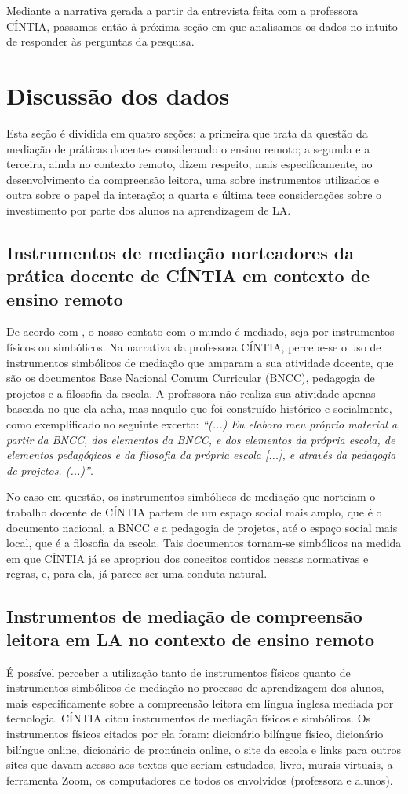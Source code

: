 \documentclass{textolivre}
\begin{document}
Mediante a narrativa gerada a partir da entrevista feita com a professora CÍNTIA, passamos então à próxima seção em que analisamos os dados no intuito de responder às perguntas da pesquisa.

\section{Discussão dos dados}
Esta seção é dividida em quatro seções: a primeira que trata da questão da mediação de práticas docentes considerando o ensino remoto; a segunda e a terceira, ainda no contexto remoto, dizem respeito, mais especificamente, ao desenvolvimento da compreensão leitora, uma sobre instrumentos utilizados e outra sobre o papel da interação; a quarta e última tece considerações sobre o investimento por parte dos alunos na aprendizagem de LA.

\subsection{Instrumentos de mediação norteadores da prática docente de CÍNTIA em contexto de ensino remoto}
De acordo com \textcite{vygotsky1978}, o nosso contato com o mundo é mediado, seja por instrumentos físicos ou simbólicos. Na narrativa da professora CÍNTIA, percebe-se o uso de instrumentos simbólicos de mediação que amparam a sua atividade docente, que são os documentos Base Nacional Comum Curricular (BNCC), pedagogia de projetos e a filosofia da escola. A professora não realiza sua atividade apenas baseada no que ela acha, mas naquilo que foi construído histórico e socialmente, como exemplificado no seguinte excerto: \emph{“(...) Eu elaboro meu próprio material a partir da BNCC, dos elementos da BNCC, e dos elementos da própria escola, de elementos pedagógicos e da filosofia da própria escola [...], e através da pedagogia de projetos. (...)”}.

No caso em questão, os instrumentos simbólicos de mediação que norteiam o trabalho docente de CÍNTIA partem de um espaço social mais amplo, que é o documento nacional, a BNCC e a pedagogia de projetos, até o espaço social mais local, que é a filosofia da escola. Tais documentos tornam-se simbólicos na medida em que CÍNTIA já se apropriou dos conceitos contidos nessas normativas e regras, e, para ela, já parece ser uma conduta natural.

\subsection{Instrumentos de mediação de compreensão leitora em LA no contexto de ensino remoto}
É possível perceber a utilização tanto de instrumentos físicos quanto de instrumentos simbólicos de mediação no processo de aprendizagem dos alunos, mais especificamente sobre a compreensão leitora em língua inglesa mediada por tecnologia. CÍNTIA citou instrumentos de mediação físicos e simbólicos. Os instrumentos físicos citados por ela foram: dicionário bilíngue físico, dicionário bilíngue online, dicionário de pronúncia online, o site da escola e links para outros sites que davam acesso aos textos que seriam estudados, livro, murais virtuais, a ferramenta Zoom, os computadores de todos os envolvidos (professora e alunos).
\end{document}
